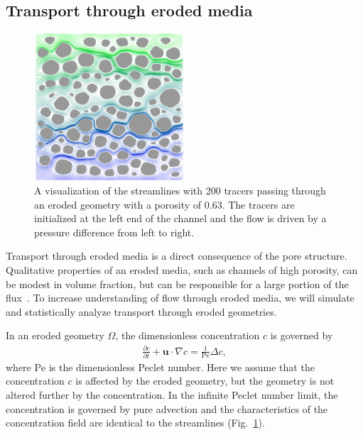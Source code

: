 \documentclass[11pt]{article}
\newcommand{\pd}[2]{ \frac{ \partial #1}{ \partial #2 } }
\newcommand{\bvec}[1]{{\mathbf{#1}}}
\newcommand{\Pe}{\mathrm{Pe}}
\newcommand{\uu}{\bvec{u}}
\begin{document}
 
\subsection{Transport through eroded media}

\begin{figure}
  \includegraphics[width=0.5\textwidth]{figs/100b_t100tracer}
  \caption{\label{fig:100tracers} A visualization of the streamlines
  with 200 tracers passing through an eroded geometry with a porosity of
  0.63. The tracers are initialized at the left end of the channel and
  the flow is driven by a pressure difference from left to right.}
\end{figure}

Transport through eroded media is a direct consequence of the pore structure. Qualitative properties of an eroded media, such as channels of high porosity, can be modest in volume fraction, but can be responsible for a large portion of the flux~\cite{Quaife2018}.  To increase understanding of flow through eroded media, we will simulate and statistically analyze transport through eroded geometries.

In an eroded geometry $\Omega$, the dimensionless
concentration $c$ is governed by
\begin{align}
  \pd{c}{t} + \uu \cdot \nabla c = \frac{1}{\Pe} \Delta c, 
  \label{eqn:advectionDiffusion}
\end{align}
where $\Pe$ is the dimensionless Peclet number. Here we assume that the
concentration $c$ is affected by the eroded geometry, but the geometry
is not altered further by the concentration. In the infinite Peclet
number limit, the concentration is governed by pure advection and the
characteristics of the concentration field are identical to the
streamlines (Fig.~\ref{fig:100tracers}).
\end{document}
